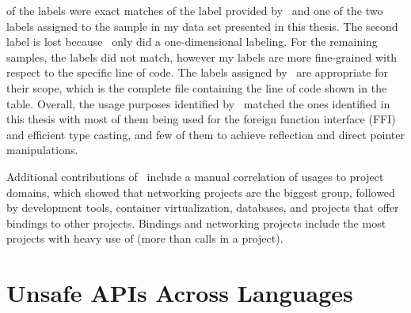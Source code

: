 

 of the labels were exact matches of the label provided by~\cite{costa2020} and one of the two labels
assigned to the sample in my data set presented in this thesis.
The second label is lost because~\cite{costa2020} only did a one-dimensional labeling.
For the remaining  samples, the labels did not match, however my labels are more fine-grained with respect
to the specific line of code.
The labels assigned by~\cite{costa2020} are appropriate for their scope, which is the complete file containing the line
of code shown in the table.
Overall, the usage purposes identified by~\cite{costa2020} matched the ones identified in this thesis with most of them
being used for the foreign function interface (\acrshort{FFI}) and efficient type casting, and few of them to achieve
reflection and direct pointer manipulations.

Additional contributions of~\cite{costa2020} include a manual correlation of \unsafe{} usages to project domains, which
showed that networking projects are the biggest group, followed by development tools, container virtualization,
databases, and projects that offer bindings to other projects.
Bindings and networking projects include the most projects with heavy use of \unsafe{} (more than  calls
in a project).



\section{Unsafe APIs Across Languages}\label{sec:related-work:unsafe-across-languages}

